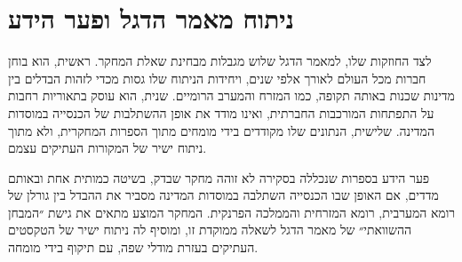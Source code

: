 \section{ניתוח מאמר הדגל ופער הידע}
\label{sec:lit-gap}

לצד החוזקות שלו, למאמר הדגל שלוש מגבלות מבחינת שאלת המחקר. ראשית, הוא בוחן חברות מכל העולם לאורך אלפי שנים, ויחידות הניתוח שלו גסות מכדי לזהות הבדלים בין מדינות שכנות באותה תקופה, כמו המזרח והמערב הרומיים. שנית, הוא עוסק בתאוריות רחבות על התפתחות המורכבות החברתית, ואינו מודד את אופן ההשתלבות של הכנסייה במוסדות המדינה. שלישית, הנתונים שלו מקודדים בידי מומחים מתוך הספרות המחקרית, ולא מתוך ניתוח ישיר של המקורות העתיקים עצמם.

\begin{keybox}{פער הידע}
בספרות שנכללה בסקירה לא זוהה מחקר שבדק, בשיטה כמותית אחת ובאותם מדדים, אם האופן שבו הכנסייה השתלבה במוסדות המדינה מסביר את ההבדל בין גורלן של רומא המערבית, רומא המזרחית והממלכה הפרנקית. המחקר המוצע מתאים את גישת ״המבחן ההשוואתי״ של מאמר הדגל לשאלה ממוקדת זו, ומוסיף לה ניתוח ישיר של הטקסטים העתיקים בעזרת מודלי שפה, עם תיקוף בידי מומחה.
\end{keybox}
